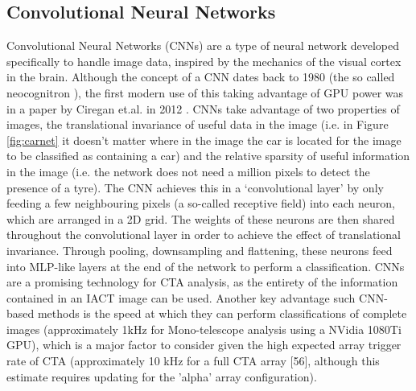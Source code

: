\subsection{Convolutional Neural Networks}
Convolutional Neural Networks (CNNs) are a type of neural network developed specifically to handle image data, inspired by the mechanics of the visual cortex in the brain. Although the concept of a CNN dates back to 1980 (the so called neocognitron \cite{neocongnitron}), the first modern use of this taking advantage of GPU power was in a paper by Ciregan et.al. in 2012 \cite{ciregan}. CNNs take advantage of two properties of images, the translational invariance of useful data in the image (i.e. in Figure \ref{fig:carnet} it doesn't matter where in the image the car is located for the image to be classified as containing a car) and the relative sparsity of useful information in the image (i.e. the network does not need a million pixels to detect the presence of a tyre). The CNN achieves this in a `convolutional layer' by only feeding a few neighbouring pixels (a so-called receptive field) into each neuron, which are arranged in a 2D grid. The weights of these neurons are then shared throughout the convolutional layer in order to achieve the effect of translational invariance. Through pooling, downsampling and flattening, 
these neurons feed into MLP-like layers at the end of the network to perform a classification. CNNs are a promising technology for CTA analysis, as the entirety of the information contained in an IACT image can be used.  Another key advantage such CNN-based methods is the speed at which they can perform classifications of complete images (approximately 1kHz for Mono-telescope analysis using a NVidia 1080Ti GPU), which is a major factor to consider given the high expected array trigger rate of CTA (approximately 10 kHz for a full CTA array [56], although this estimate requires updating for the 'alpha' array configuration).

